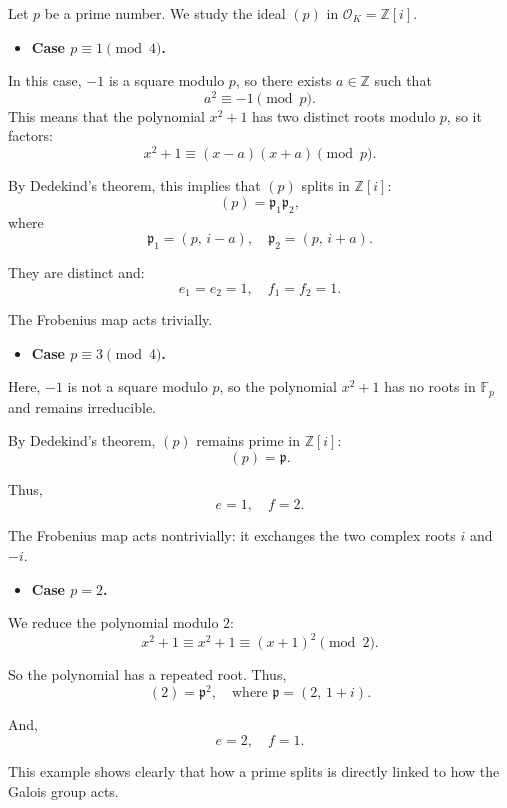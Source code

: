Let $p$ be a prime number. We study the ideal $(p)$ in $\mathcal{O}_K = \mathbb{Z}[i]$.

\begin{itemize}
    \item \textbf{Case $p \equiv 1 \pmod{4}$.}
\end{itemize}

In this case, $-1$ is a square modulo $p$, so there exists $a \in \mathbb{Z}$ such that
\[
a^2 \equiv -1 \pmod{p}.
\]
This means that the polynomial $x^2 + 1$ has two distinct roots modulo $p$, so it factors:
\[
x^2 + 1 \equiv (x - a)(x + a) \pmod{p}.
\]

By Dedekind’s theorem, this implies that $(p)$ splits in $\mathbb{Z}[i]$:
\[
(p) = \mathfrak{p}_1 \mathfrak{p}_2,
\]
where
\[
\mathfrak{p}_1 = (p,\, i - a), \quad \mathfrak{p}_2 = (p,\, i + a).
\]

They are distinct and:
\[
e_1 = e_2 = 1, \quad f_1 = f_2 = 1.
\]

The Frobenius map acts trivially.
\medskip

\begin{itemize}
    \item\textbf{Case $p \equiv 3 \pmod{4}$.}
\end{itemize}

Here, $-1$ is not a square modulo $p$, so the polynomial $x^2 + 1$ has no roots in $\mathbb{F}_p$ and remains irreducible.

By Dedekind’s theorem, $(p)$ remains prime in $\mathbb{Z}[i]$:
\[
(p) = \mathfrak{p}.
\]

Thus,
\[
e = 1, \quad f = 2.
\]

The Frobenius map acts nontrivially: it exchanges the two complex roots $i$ and $-i$.

\medskip

\begin{itemize}
    \item \textbf{Case $p = 2$.}  
\end{itemize}

We reduce the polynomial modulo $2$:
\[
x^2 + 1 \equiv x^2 + 1 \equiv (x+1)^2 \pmod{2}.
\]

So the polynomial has a repeated root. Thus,
\[
(2) = \mathfrak{p}^2,
\quad \text{where } \mathfrak{p} = (2,\, 1+i).
\]

And,
\[
e = 2, \quad f = 1.
\]


This example shows clearly that how a prime splits is directly linked to how the Galois group acts.
\\
